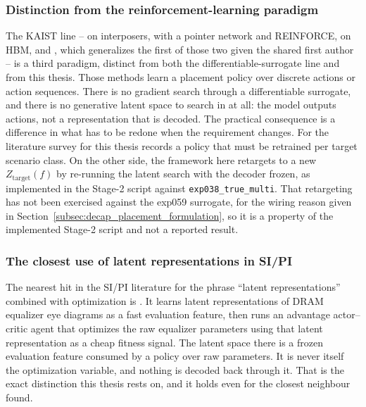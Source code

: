 \subsubsection*{Distinction from the reinforcement-learning paradigm}

The KAIST line -- \cite{park2020drldecap} on interposers, \cite{kim2021epeps}
with a pointer network and REINFORCE, \cite{park2022transformer} on HBM, and
\cite{kim2023devformer}, which generalizes the first of those two given the
shared first author -- is a third paradigm, distinct from both the
differentiable-surrogate line and from this thesis. Those methods learn a
placement policy over discrete actions or action sequences. There is no gradient
search through a differentiable surrogate, and there is no generative latent
space to search in at all: the model outputs actions, not a representation that
is decoded. The practical consequence is a difference in what has to be redone
when the requirement changes. For \cite{kim2023devformer} the literature survey
for this thesis records a policy that must be retrained per target scenario
class. On the other side, the framework here retargets to a new
$Z_{\mathrm{target}}(f)$ by re-running the latent search with the decoder
frozen, as implemented in the Stage-2 script against
\texttt{exp038\_true\_multi}. That retargeting has not been exercised against
the exp059 surrogate, for the wiring reason given in
Section~\ref{subsec:decap_placement_formulation}, so it is a property of the
implemented Stage-2 script and not a reported result.

\subsubsection*{The closest use of latent representations in SI/PI}

The nearest hit in the SI/PI literature for the phrase ``latent
representations'' combined with optimization is \cite{usama2025dram}. It learns
latent representations of DRAM equalizer eye diagrams as a fast evaluation
feature, then runs an advantage actor--critic agent that optimizes the raw
equalizer parameters using that latent representation as a cheap fitness signal.
The latent space there is a frozen evaluation feature consumed by a policy over
raw parameters. It is never itself the optimization variable, and nothing is
decoded back through it. That is the exact distinction this thesis rests on, and
it holds even for the closest neighbour found.

